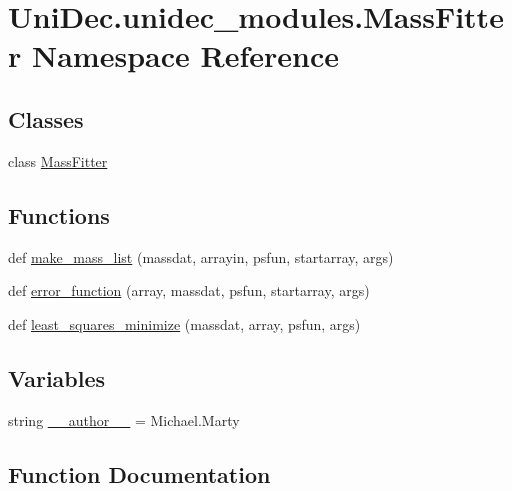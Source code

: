 \hypertarget{namespace_uni_dec_1_1unidec__modules_1_1_mass_fitter}{}\section{Uni\+Dec.\+unidec\+\_\+modules.\+Mass\+Fitter Namespace Reference}
\label{namespace_uni_dec_1_1unidec__modules_1_1_mass_fitter}
\subsection*{Classes}
\begin{DoxyCompactItemize}
\item 
class \hyperlink{class_uni_dec_1_1unidec__modules_1_1_mass_fitter_1_1_mass_fitter}{Mass\+Fitter}
\end{DoxyCompactItemize}
\subsection*{Functions}
\begin{DoxyCompactItemize}
\item 
def \hyperlink{namespace_uni_dec_1_1unidec__modules_1_1_mass_fitter_a475d55a4f3605e581d58f84e511cd447}{make\+\_\+mass\+\_\+list} (massdat, arrayin, psfun, startarray, args)
\item 
def \hyperlink{namespace_uni_dec_1_1unidec__modules_1_1_mass_fitter_afe421f5168bf82a14dd6bedc2cc11691}{error\+\_\+function} (array, massdat, psfun, startarray, args)
\item 
def \hyperlink{namespace_uni_dec_1_1unidec__modules_1_1_mass_fitter_aee8ca465ccb298d7379013600bc705ab}{least\+\_\+squares\+\_\+minimize} (massdat, array, psfun, args)
\end{DoxyCompactItemize}
\subsection*{Variables}
\begin{DoxyCompactItemize}
\item 
string \hyperlink{namespace_uni_dec_1_1unidec__modules_1_1_mass_fitter_a3ccaae9a720dbf47f61421cd8ebced7d}{\+\_\+\+\_\+author\+\_\+\+\_\+} = \textquotesingle{}Michael.\+Marty\textquotesingle{}
\end{DoxyCompactItemize}


\subsection{Function Documentation}
\hypertarget{namespace_uni_dec_1_1unidec__modules_1_1_mass_fitter_afe421f5168bf82a14dd6bedc2cc11691}{}
